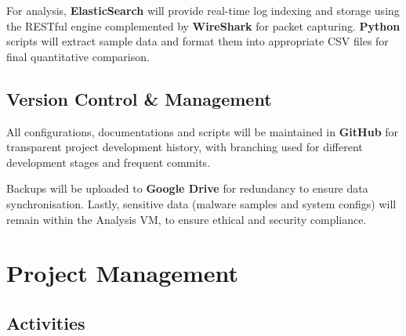 \documentclass[a4paper,12pt,oneside]{book}			%
\begin{document}
For analysis, \textbf{ElasticSearch} will provide real-time log indexing and storage using the RESTful engine complemented by \textbf{WireShark} for packet capturing. \textbf{Python} scripts will extract sample data and format them into appropriate CSV files for final quantitative comparison.




\section{Version Control \&{} Management}\label{sec:versionControl}

All configurations, documentations and scripts will be maintained in \textbf{GitHub} for transparent project development history, with branching used for different development stages and frequent commits.


Backups will be uploaded to \textbf{Google Drive} for redundancy to ensure data synchronisation. Lastly, sensitive data (malware samples and system configs) will remain within the Analysis VM, to ensure ethical and security compliance.



\chapter{Project Management}\label{ch:project management}
\section{Activities}\label{sec:activities}
\end{document}
